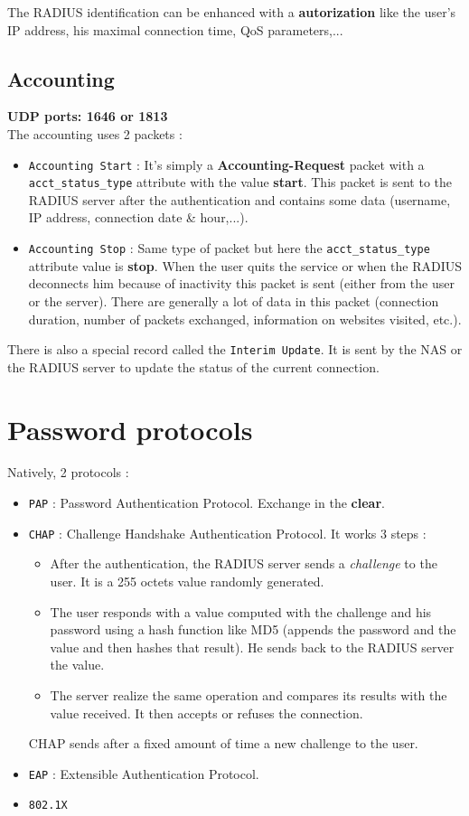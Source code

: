 \documentclass[10pt,a4paper]{article}
\begin{document}
The RADIUS identification can be enhanced with a \textbf{autorization} like the user's IP address, his maximal connection time, QoS parameters,...

\subsection{Accounting}
\textbf{UDP ports: 1646 or 1813}\\
The accounting uses 2 packets :
\begin{itemize}
\item \texttt{Accounting Start} : It's simply a \textbf{Accounting-Request} packet with a \texttt{acct\_status\_type} attribute with the value \textbf{start}. This packet is sent to the RADIUS server after the authentication and contains some data (username, IP address, connection date \& hour,...).
\item \texttt{Accounting Stop} : Same type of packet but here the \texttt{acct\_status\_type} attribute value is \textbf{stop}. When the user quits the service or when the RADIUS deconnects him because of inactivity this packet is sent (either from the user or the server). There are generally a lot of data in this packet (connection duration, number of packets exchanged, information on websites visited, etc.).
\end{itemize}
There is also a special record called the \texttt{Interim Update}. It is sent by the NAS or the RADIUS server to update the status of the current connection.

\section{Password protocols}
Natively, 2 protocols :
\begin{itemize}
\item \texttt{PAP} : Password Authentication Protocol. Exchange in the \textbf{clear}.
\item \texttt{CHAP} : Challenge Handshake Authentication Protocol. It works 3 steps :
	\begin{itemize}
	\item After the authentication, the RADIUS server sends a \textit{challenge} to the user. It is a 255 octets value randomly generated.
	\item The user responds with a value computed with the challenge and his password using a hash function like MD5 (appends the password and the value and then hashes that result). He sends back to the RADIUS server the value.
	\item The server realize the same operation and compares its results with the value received. It then accepts or refuses the connection.
\end{itemize}
	CHAP sends after a fixed amount of time a new challenge to the user.
\item \texttt{EAP} : Extensible Authentication Protocol.
\item \texttt{802.1X} 
\end{itemize}
\end{document}
